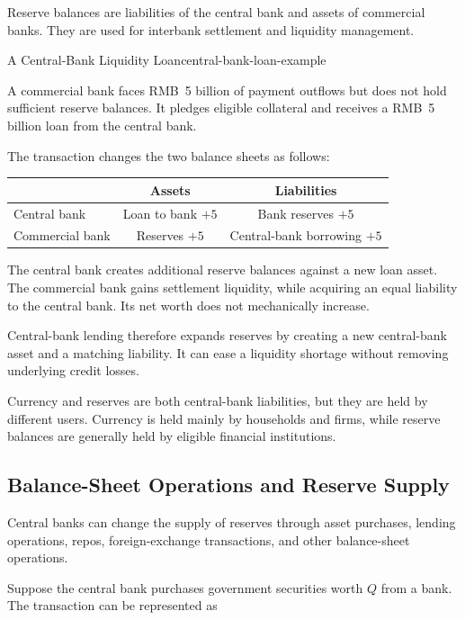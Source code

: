 Reserve balances are liabilities of the central bank and assets of commercial banks. They are used for interbank settlement and liquidity management.
\begin{example}{A Central-Bank Liquidity Loan}{central-bank-loan-example}

A commercial bank faces RMB~5 billion of payment outflows but does not hold sufficient reserve balances. It pledges eligible collateral and receives a RMB~5 billion loan from the central bank.

The transaction changes the two balance sheets as follows:

\begin{center}
\begin{tabular}{lcc}
\toprule
& \textbf{Assets} & \textbf{Liabilities} \\
\midrule
Central bank
& Loan to bank \(+5\)
& Bank reserves \(+5\) \\

Commercial bank
& Reserves \(+5\)
& Central-bank borrowing \(+5\) \\
\bottomrule
\end{tabular}
\end{center}

The central bank creates additional reserve balances against a new loan asset. The commercial bank gains settlement liquidity, while acquiring an equal liability to the central bank. Its net worth does not mechanically increase.

\end{example}


Central-bank lending therefore expands reserves by creating a new central-bank asset and a matching liability. It can ease a liquidity shortage without removing underlying credit losses.

Currency and reserves are both central-bank liabilities, but they are held by different users. Currency is held mainly by households and firms, while reserve balances are generally held by eligible financial institutions.


\subsection{Balance-Sheet Operations and Reserve Supply}

Central banks can change the supply of reserves through asset purchases, lending operations, repos, foreign-exchange transactions, and other balance-sheet operations.

Suppose the central bank purchases government securities worth \(Q\) from a bank. The transaction can be represented as

